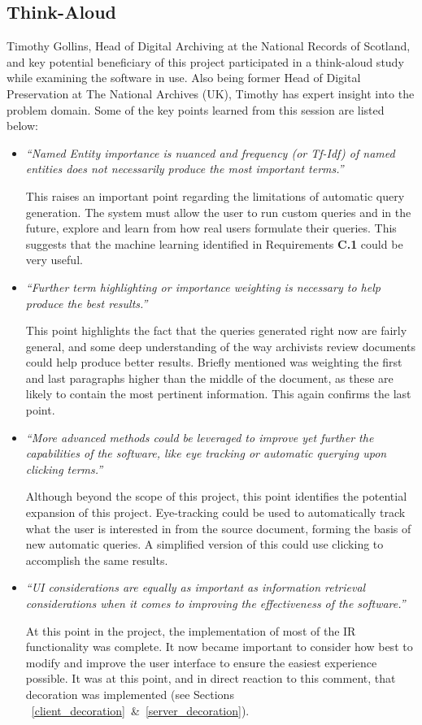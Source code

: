 \documentclass{l4proj}
\begin{document}
\subsection{Think-Aloud}
Timothy Gollins, Head of Digital Archiving at the National Records of Scotland, and key potential beneficiary of this project participated in a think-aloud study while examining the software in use. Also being former Head of Digital Preservation at The National Archives (UK), Timothy has expert insight into the problem domain.
Some of the key points learned from this session are listed below:
\begin{itemize}
\item \textit{``Named Entity importance is nuanced and frequency (or Tf-Idf) of named entities does not necessarily produce the most important terms.''}
\par
This raises an important point regarding the limitations of automatic query generation. The system must allow the user to run custom queries and in the future, explore and learn from how real users formulate their queries. This suggests that the machine learning identified in Requirements \textbf{C.1} could be very useful.
\item \textit{``Further term highlighting or importance weighting is necessary to help produce the best results.''}
\par
This point highlights the fact that the queries generated right now are fairly general, and some deep understanding of the way archivists review documents could help produce better results. Briefly mentioned was weighting the first and last paragraphs higher than the middle of the document, as these are likely to contain the most pertinent information. This again confirms the last point.
\item \textit{``More advanced methods could be leveraged to improve yet further the capabilities of the software, like eye tracking or automatic querying upon clicking terms.''}
\par
Although beyond the scope of this project, this point identifies the potential expansion of this project. Eye-tracking could be used to automatically track what the user is interested in from the source document, forming the basis of new automatic queries. A simplified version of this could use clicking to accomplish the same results.
\item \textit{``UI considerations are equally as important as information retrieval considerations when it comes to improving the effectiveness of the software.''}
\par
At this point in the project, the implementation of most of the IR functionality was complete. It now became important to consider how best to modify and improve the user interface to ensure the easiest experience possible. It was at this point, and in direct reaction to this comment, that decoration was implemented (see Sections ~\ref{client_decoration}~\&~\ref{server_decoration}).
\end{itemize}
\end{document}

